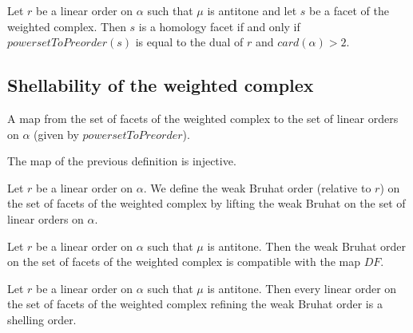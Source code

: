 \begin{sublemma}
Let $r$ be a linear order on $\alpha$ such that $\mu$ is antitone and let $s$ be a facet of the weighted complex. Then $s$ is a homology facet if
and only if $powersetToPreorder(s)$ is equal to the dual of $r$ and $card(\alpha)>2$.

\end{sublemma}


\subsection{Shellability of the weighted complex}

\begin{subdefi}
A map from the set of facets of the weighted complex to the set of linear orders on $\alpha$ (given by $powersetToPreorder$).

\end{subdefi}

\begin{sublemma}
The map of the previous definition is injective.

\end{sublemma}

\begin{subdefi}
Let $r$ be a linear order on $\alpha$. We define the weak Bruhat order (relative to $r$) on the set of facets of the weighted complex by
lifting the weak Bruhat on the set of linear orders on $\alpha$.

\end{subdefi}

\begin{sublemma}
Let $r$ be a linear order on $\alpha$ such that $\mu$ is antitone. Then the weak Bruhat order on the set of facets of the weighted complex
is compatible with the map $DF$.

\end{sublemma}

\begin{sublemma}[WeightedComplexShelling]
Let $r$ be a linear order on $\alpha$ such that $\mu$ is antitone. Then every linear order on the set of facets of the weighted complex refining
the weak Bruhat order is a shelling order.

\end{sublemma}


